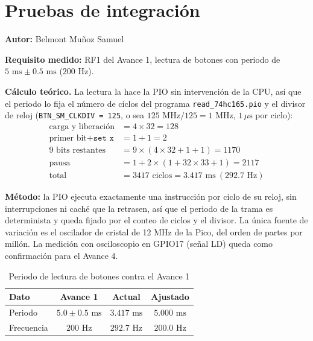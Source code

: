 \section{Pruebas de integración}
\textbf{Autor:} Belmont Muñoz Samuel

\textbf{Requisito medido:} RF1 del Avance 1, lectura de botones con periodo de $5\text{ ms} \pm 0.5\text{ ms}$ ($200\text{ Hz}$).

\textbf{Cálculo teórico.} La lectura la hace la PIO sin intervención de la CPU, así que el periodo lo fija
el número de ciclos del programa \texttt{read\_74hc165.pio} y el divisor de reloj
(\texttt{BTN\_SM\_CLKDIV = 125}, o sea $125\text{ MHz}/125 = 1\text{ MHz}$, $1\,\mu\text{s}$ por ciclo):
\begin{align*}
	\text{carga y liberación} &= 4 \times 32 = 128 \\
	\text{primer bit} + \texttt{set x} &= 1 + 1 = 2 \\
	\text{9 bits restantes} &= 9 \times (4 \times 32 + 1 + 1) = 1170 \\
	\text{pausa} &= 1 + 2 \times (1 + 32 \times 33 + 1) = 2117 \\
	\text{total} &= 3417 \text{ ciclos} = 3.417\text{ ms}\ (292.7\text{ Hz})
\end{align*}

\textbf{Método:} la PIO ejecuta exactamente una instrucción por ciclo de su reloj, sin interrupciones ni caché
que la retrasen, así que el periodo de la trama es determinista y queda fijado por el conteo de ciclos y el divisor.
La única fuente de variación es el oscilador de cristal de 12 MHz de la Pico, del orden de partes por millón.
La medición con osciloscopio en GPIO17 (señal LD) queda como confirmación para el Avance 4.

\begin{table}[H]
	\centering
	\caption{Periodo de lectura de botones contra el Avance 1}
	\label{tab:medicion}
	\small
	\begin{tabular}{|l|c|c|c|}
		\hline
		\textbf{Dato} & \textbf{Avance 1} & \textbf{Actual} & \textbf{Ajustado} \\
		\hline
		Periodo & $5.0 \pm 0.5\text{ ms}$ & $3.417\text{ ms}$ & $5.000\text{ ms}$ \\
		\hline
		Frecuencia & $200\text{ Hz}$ & $292.7\text{ Hz}$ & $200.0\text{ Hz}$ \\
		\hline
	\end{tabular}
\end{table}

